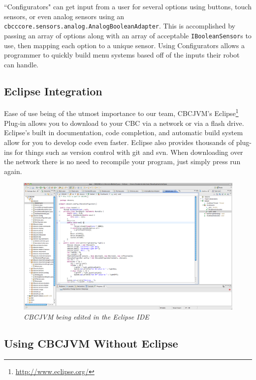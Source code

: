 \documentclass[10pt,letterpaper]{article}
\newcommand{\urlfootnote}[1]{\footnote{\url{#1}}}
\begin{document}
``Configurators" can get input from a user for several options using buttons, touch sensors, or even analog sensors using an \texttt{cbcccore.\-sensors.\-analog.\-AnalogBooleanAdapter}. This is accomplished by passing an array of options along with an array of acceptable \texttt{IBooleanSensor}s to use, then mapping each option to a unique sensor. Using Configurators allows a programmer to quickly build menu systems based off of the inputs their robot can handle.



\subsection{Eclipse Integration}

Ease of use being of the utmost importance to our team, CBCJVM's Eclipse\urlfootnote{http://www.eclipse.org/} Plug-in allows you to download to your CBC via a network or via a flash drive. Eclipse's built in documentation, code completion, and automatic build system allow for you to develop code even faster. Eclipse also provides thousands of plug-ins for things such as version control with git and svn. When downloading over the network there is no need to recompile your program, just simply press run again.

\begin{figure}[H]
\includegraphics[width=\textwidth]{eclipse.png}
\caption{\textit{CBCJVM being edited in the Eclipse IDE}}
\end{figure}


\subsection{Using CBCJVM Without Eclipse}
\end{document}
